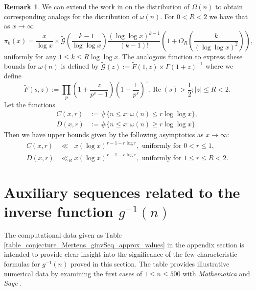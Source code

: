 \documentclass[11pt,reqno,a4letter]{article}
\numberwithin{figure}{section}
\numberwithin{table}{section}
\theoremstyle{plain}
\numberwithin{theorem}{section}
\theoremstyle{definition}
\newtheorem{remark}[theorem]{Remark}
\renewcommand{\Re}{\operatorname{Re}}
\begin{document}
\begin{remark} 
\label{remark_MV_Pikx_FuncResultsAnnotated_v1} 
We can extend the work in \cite{MV} on the distribution of $\Omega(n)$ to obtain 
corresponding analogs for the distribution of $\omega(n)$. 
For $0 < R < 2$ we have that as $x \rightarrow \infty$ 
\begin{equation}
\label{eqn_Pikx_UniformAsymptoticsStmt_from_MV_v2} 
\pi_k(x) = \frac{x}{\log x} \times 
     \widetilde{\mathcal{G}}\left(\frac{k-1}{\log\log x}\right) 
     \frac{(\log\log x)^{k-1}}{(k-1)!} \left( 
     1 + O_R\left(\frac{k}{(\log\log x)^2}\right) 
     \right), 
\end{equation}
uniformly for any $1 \leq k \leq R\log\log x$. 
The analogous function to express these bounds for $\omega(n)$ is 
defined by $\widetilde{\mathcal{G}}(z) := \widetilde{F}(1, z) \times \Gamma(1+z)^{-1}$ where 
we define 
\[
\widetilde{F}(s, z) := \prod_p \left(1 + \frac{z}{p^s-1}\right) \left(1 - \frac{1}{p^s}\right)^{z}, 
     \Re(s) > \frac{1}{2}; |z| \leq R < 2. 
\]
Let the functions 
\begin{align*} 
C(x, r) & := \#\{n \leq x: \omega(n) \leq r \log\log x\}, \\ 
D(x, r) & := \#\{n \leq x: \omega(n) \geq r \log\log x\}. 
\end{align*} 
Then we have upper bounds given by the following asymptotics as $x \rightarrow \infty$: 
\begin{align*} 
C(x, r) & \ll\phantom{_R} x (\log x)^{r - 1 - r \log r}, \text{ uniformly for } 0 < r \leq 1, \\ 
D(x, r) & \ll_R x (\log x)^{r - 1 - r \log r}, \text{ uniformly for } 1 \leq r \leq R < 2.
\end{align*} 
\end{remark} 

\section{Auxiliary sequences related to the inverse function $g^{-1}(n)$} 
\label{Section_InvFunc_PreciseExpsAndAsymptotics} 

The computational data given as Table \ref{table_conjecture_Mertens_ginvSeq_approx_values} 
in the appendix section is intended to 
provide clear insight into the significance of the few characteristic formulas for  
$g^{-1}(n)$ proved in this section. The table provides illustrative 
numerical data by examining the first cases of $1 \leq n \leq 500$ with 
\emph{Mathematica} and \emph{Sage} 
\cite{SCHMIDT-MERTENS-COMPUTATIONS}. 
\end{document}
